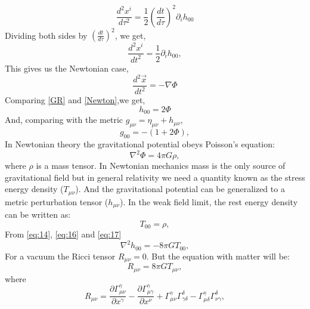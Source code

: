 \documentclass{ttuthes2007}
\begin{document}
\begin{equation}                                                                
\frac{d^2x^i}{d\tau ^2}=\frac{1}{2} \left(\frac{dt}{d\tau}\right)^2 \partial _i
h_{00}
\end{equation} 
Dividing both sides by $\left(\frac{dt}{d\tau}\right)^2$, we get,
\begin{equation}\label{GR}
\frac{d^2x^i}{dt^2}=\frac{1}{2} \partial _i h_{00},
\end{equation} 
This gives us the Newtonian case,
\begin{equation} \label{Newton}
\frac{d^2\vec{x}}{dt^2}=-\nabla \Phi
\end{equation}
Comparing \ref{GR} and \ref{Newton},we get,
\begin{equation} \label{eq:14}
h_{00}=2\Phi
\end{equation}
And, comparing with the metric $g_{\mu \nu}= \eta_{\mu \nu} + h_{\mu \nu}$,
\begin{equation}\label{eq:15}
g_{00}=-(1+2\Phi),
\end{equation}
In Newtonian theory the gravitational potential obeys Poisson's
equation:
\begin{equation} \label{eq:16}
\nabla ^ 2\Phi = 4\pi G\rho,
\end{equation}
where $\rho$ is a
mass tensor. In Newtonian mechanics mass is the only source of gravitational
field but in general relativity we need a quantity known as the stress energy
density ($T_{\mu\nu}$). And the gravitational potential can be generalized to a
metric perturbation tensor ($h_{\mu\nu}$).
In the weak field limit, the rest energy density can be written as:
\begin{equation}\label{eq:17}
T_{00}=\rho,
\end{equation}
From \ref{eq:14}, \ref{eq:16} and \ref{eq:17}
\begin{equation} \label{eq:18}
\nabla ^2h_{00}=-8\pi GT_{00},
\end{equation}
For a vacuum the Ricci tensor $R_{\mu \nu} = 0$. But the equation with matter will be:
\begin{equation} \label{eq:19}
R_{\mu \nu} = 8 \pi GT_{\mu \nu},
\end{equation}
where
\begin{equation} \label{eq:22}
R_{\mu \nu} = \frac{\partial \Gamma ^\gamma _{\mu \nu}}{\partial x^\gamma} -
\frac{\partial \Gamma ^\gamma _{\mu \gamma}}{\partial x^\nu}+ \Gamma ^\gamma
_{\mu \nu}\Gamma ^\delta _{\gamma \delta}-\Gamma ^\gamma _{\mu \delta}\Gamma
^\delta_{\nu \gamma},
\end{equation}
\end{document}
